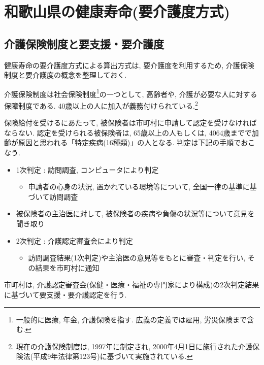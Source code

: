 \section{和歌山県の健康寿命(要介護度方式)}
\subsection{介護保険制度と要支援・要介護度}
健康寿命の要介護度方式による算出方式は, 要介護度を利用するため, 介護保険制度と要介護度の概念を整理しておく.

介護保険制度は社会保険制度\footnote{一般的に医療, 年金, 介護保険を指す. 広義の定義では雇用, 労災保険まで含む.
}の一つとして,
高齢者や, 介護が必要な人に対する保障制度である.
40歳以上の人に加入が義務付けられている.\footnote{
	現在の介護保険制度は, 1997年に制定され, 2000年4月1日に施行された介護保険法(平成9年法律第123号)に基づいて実施されている.
}


保険給付を受けるにあたって, 被保険者は市町村に申請して認定を受けなければならない.
認定を受けられる被保険者は, 65歳以上の人もしくは, 4064歳までで加齢が原因と思われる「特定疾病(16種類)」の人となる.
判定は下記の手順でおこなう.
\begin{itemize} \setlength{\itemsep}{-0.5mm} \setlength{\parskip}{-0.5mm}
	\item 1次判定  :  訪問調査, コンピュータにより判定
	      \begin{itemize} \setlength{\itemsep}{-0.5mm} \setlength{\parskip}{-0.5mm}
		      \item 申請者の心身の状況, 置かれている環境等について, 全国一律の基準に基づいて訪問調査
	      \end{itemize}
	\item 被保険者の主治医に対して, 被保険者の疾病や負傷の状況等について意見を聞き取り
	\item 2次判定  :  介護認定審査会により判定
	      \begin{itemize} \setlength{\itemsep}{-0.5mm} \setlength{\parskip}{-0.5mm}
		      \item 訪問調査結果(1次判定)や主治医の意見等をもとに審査・判定を行い, その結果を市町村に通知
	      \end{itemize}
\end{itemize}
市町村は, 介護認定審査会(保健・医療・福祉の専門家により構成)の2次判定結果に基づいて要支援・要介護認定を行う.


